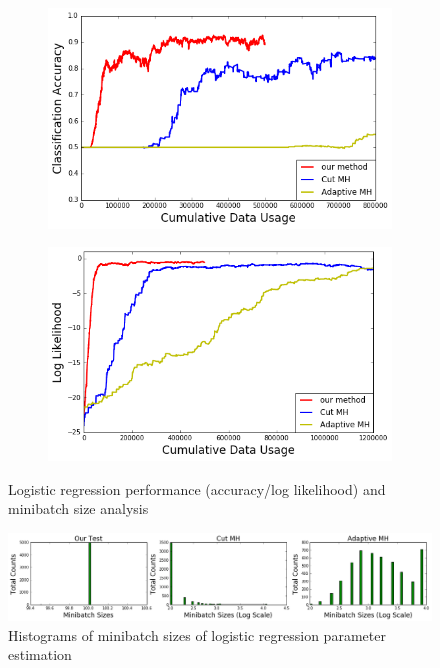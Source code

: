 \documentclass{article}
\begin{document}
\begin{figure}[t]
    \centering
    \begin{subfigure}{.4\textwidth}
     \centering
     \includegraphics[width=1\linewidth]{LogisticRegressionResult/acc_logistic}
    \end{subfigure}
    \begin{subfigure}{.4\textwidth}
     \centering
    \includegraphics[width=1\linewidth]{LogisticRegressionResult/ll_logistic}
\end{subfigure}
\caption{Logistic regression performance (accuracy/log likelihood) and minibatch size analysis}
\label{fig:logistic_fig}
\vspace{-10pt}
\end{figure}

\begin{figure}[t]
	\centering
	\includegraphics[width=1\linewidth]{LogisticRegressionResult/minibatch_size_logistic.png}
	\caption{Histograms of minibatch sizes of logistic regression parameter estimation}
	\label{fig:logistic_minibatch}
\end{figure}
\end{document}
